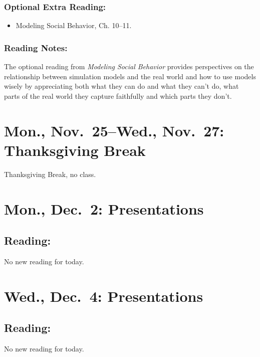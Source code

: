 \documentclass[
]{article}
\providecommand{\tightlist}{%
  \setlength{\itemsep}{0pt}\setlength{\parskip}{0pt}}
\begin{document}
\subsubsection{Optional Extra Reading:}\label{optional-extra-reading-5}

\begin{itemize}
\tightlist
\item
  Modeling Social Behavior, Ch. 10--11.
\end{itemize}

\subsubsection{Reading Notes:}\label{reading-notes-17}

The optional reading from \emph{Modeling Social Behavior} provides
perspectives on the relationship between simulation models and the real
world and how to use models wisely by appreciating both what they can do
and what they can't do, what parts of the real world they capture
faithfully and which parts they don't.

\section{Mon., Nov.~25--Wed., Nov.~27: Thanksgiving
Break}\label{mon.-nov.-25wed.-nov.-27-thanksgiving-break}

Thanksgiving Break, no class.

\section{Mon., Dec.~2: Presentations}\label{mon.-dec.-2-presentations}

\subsection{Reading:}\label{reading-26}

No new reading for today.

\section{Wed., Dec.~4: Presentations}\label{wed.-dec.-4-presentations}

\subsection{Reading:}\label{reading-27}

No new reading for today.
\end{document}
